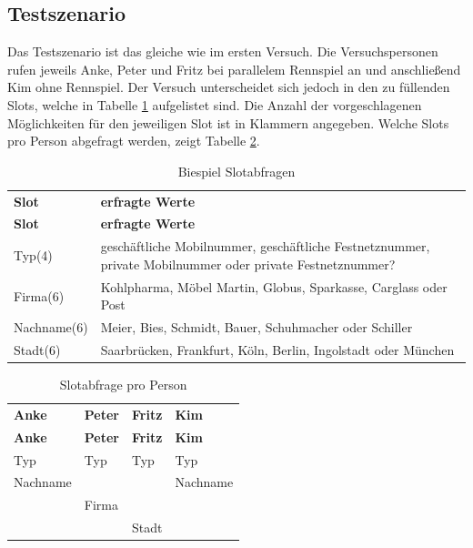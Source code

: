 \documentclass[12pt,a4paper]{scrartcl}
\begin{document}
\subsection{Testszenario}
Das Testszenario ist das gleiche wie im ersten Versuch. Die Versuchspersonen rufen jeweils Anke, Peter und Fritz bei parallelem Rennspiel an und anschließend Kim ohne Rennspiel. Der Versuch unterscheidet sich jedoch in den zu füllenden Slots, welche in Tabelle \ref{slots2} aufgelistet sind. Die Anzahl der vorgeschlagenen Möglichkeiten für den jeweiligen Slot ist in Klammern angegeben.
Welche Slots pro Person abgefragt werden, zeigt Tabelle \ref{slotsPerson2}. 
\begin{longtable}{p{4cm}p{10cm}}
	\label{slots2}\\
	\caption[Slotabfragen]{Biespiel Slotabfragen}\\
	\hline
	\textbf{Slot} &\textbf{erfragte Werte}\\
	\hline
	\endfirsthead
	\hline
	\textbf{Slot} &	\textbf{erfragte Werte}\\
	\hline
	\endhead
Typ(4) & geschäftliche Mobilnummer, geschäftliche Festnetznummer, private Mobilnummer oder private Festnetznummer?\\
Firma(6) & Kohlpharma, Möbel Martin, Globus, Sparkasse, Carglass oder Post\\
Nachname(6) & Meier, Bies, Schmidt, Bauer, Schuhmacher oder Schiller \\
Stadt(6) & Saarbrücken, Frankfurt, Köln, Berlin, Ingolstadt oder München\\


\hline
\end{longtable}


\begin{longtable}{p{}p{}p{}p{}}
	\label{slotsPerson2}\\
	\caption[Slotabfrage pro Person]{Slotabfrage pro Person}\\
	\hline
	\textbf{Anke}&\textbf{Peter}&\textbf{Fritz} &\textbf{Kim}\\
	\hline
	\endfirsthead
	\hline
	\textbf{Anke}&\textbf{Peter}&\textbf{Fritz} &\textbf{Kim}\\
	\hline
	\endhead
Typ & Typ & Typ & Typ\\
Nachname & & & Nachname \\
& Firma & & \\
& & Stadt & \\

\hline
\end{longtable}
\end{document}
